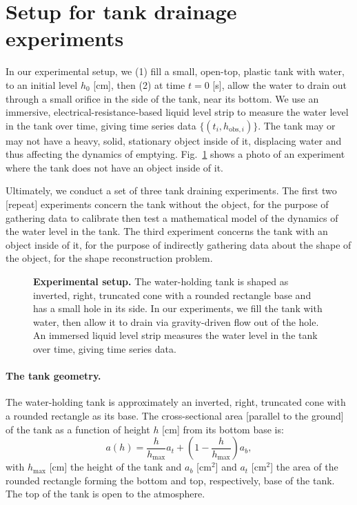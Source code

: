 \documentclass[openacc]{rsproca_new}%
\begin{document}
\section{Setup for tank drainage experiments} \label{sec:expt}
In our experimental setup, we (1) fill a small, open-top, plastic tank with water, to an initial level $h_0$ [cm], then (2) at time $t=0$ [s], allow the water to drain out through a small orifice in the side of the tank, near its bottom. 
We use an immersive, electrical-resistance-based liquid level strip to measure the water level in the tank over time, giving time series data $\{(t_i, h_{\text{obs}, i}) \}$. The tank may or may not have a heavy, solid, stationary object inside of it, displacing water and thus affecting the dynamics of emptying. Fig.~\ref{fig:photo_of_tank} shows a photo of an experiment where the tank does not have an object inside of it.

Ultimately, we conduct a set of three tank draining experiments. The first two [repeat] experiments concern the tank without the object, for the purpose of gathering data to calibrate then test a mathematical model of the dynamics of the water level in the tank. The third experiment concerns the tank with an object inside of it, for the purpose of indirectly gathering data about the shape of the object, for the shape reconstruction problem.

\begin{figure}[h!]
\begin{center}
	\caption{\textbf{Experimental setup.} 
	The water-holding tank is shaped as inverted, right, truncated cone with a rounded rectangle base and has a small hole in its side. In our experiments, we fill the tank with water, then allow it to drain via gravity-driven flow out of the hole. An immersed liquid level strip measures the water level in the tank over time, giving time series data.
	}
	\label{fig:photo_of_tank}
\end{center}
\end{figure}

\paragraph{The tank geometry.} The water-holding tank is approximately an inverted, right, truncated cone with a rounded rectangle as its base. The cross-sectional area [parallel to the ground] of the tank as a function of height $h$ [cm] from its bottom base is:
\begin{equation}
	a(h) = \frac{h}{h_{\text{max}}}a_t + \left(1-\frac{h}{h_{\text{max}}}\right) a_b, \label{eq:a_of_h}
\end{equation}
with $h_{\text{max}}$ [cm] the height of the tank and $a_b$ [cm$^2$] and $a_t$ [cm$^2$] the area of the rounded rectangle forming the bottom and top, respectively, base of the tank.
The top of the tank is open to the atmosphere. 
\end{document}
